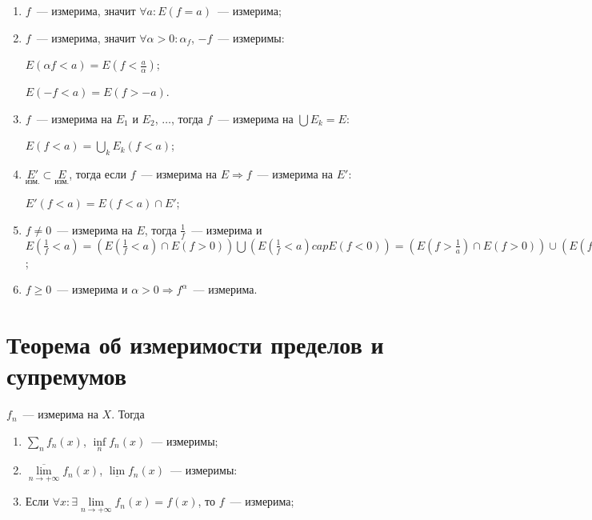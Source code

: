 \documentclass{article}
\begin{document}
        \begin{enumerate}
        
            \item $f$~--- измерима, значит $\forall a : E (f = a)$~--- измерима;
        
            \item $f$~--- измерима, значит $\forall \alpha > 0 : \alpha_f$, $-f$~--- измеримы:
            
                $E(\alpha f < a) = E \left( f < \frac{a}{\alpha} \right)$;
                
                $E(-f < a) = E(f > -a)$.
                
            \item $f$~--- измерима на $E_1$ и $E_2$, $\ldots$, тогда $f$~--- измерима на $\bigcup E_k = E$:
            
                $E(f < a) = \bigcup\limits_k E_k (f < a)$;
                
            \item $\underset{\text{изм.}}{E'} \subset \underset{\text{изм.}}{E}$, тогда если $f$~--- измерима на $E \Rightarrow f$~--- измерима на $E'$:
            
                $E'(f < a) = E(f < a) \cap E'$;
                
            \item $f \neq 0$~--- измерима на $E$, тогда $\frac{1}{f}$~--- измерима и $E \left( \frac{1}{f} < a \right) = \left(E \left(\frac{1}{f} < a \right) \cap E (f > 0) \right) \bigcup \left( E \left( \frac{1}{f} < a \right) cap E(f < 0) \right) = \left( E \left(f > \frac{1}{a} \right) \cap E (f > 0) \right) \cup \left( E \left( f < \frac{1}{a}\right) \cap E (f < 0) \right)$;
            
            \item $f \geqslant 0$~--- измерима и $\alpha > 0 \Rightarrow f^{\alpha}$~--- измерима.
            
        \end{enumerate}
        
    \newpage
    
    \section{Теорема об измеримости пределов и супремумов}
        
        $f_n$~--- измерима на $X$. Тогда
        
        \begin{enumerate}
        
            \item $\sum\limits_n f_n(x)$, $\inf\limits_n f_n(x)$~--- измеримы;
            
            \item $\overline{\lim\limits_{n \rightarrow +\infty}} f_n(x)$, $\underline{\lim} f_n(x)$~--- измеримы:
            
            \item Если $\forall x : \exists \lim\limits_{n \rightarrow +\infty} f_n(x) = f(x)$, то $f$~--- измерима;
            
        \end{enumerate}
        
\end{document}
